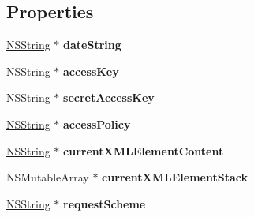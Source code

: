 \subsection*{\-Properties}
\begin{DoxyCompactItemize}
\item 
\hypertarget{interface_a_s_i_s3_request_a2d2ae1919cf3ab5f06886ca2e112f9f4}{
\hyperlink{class_n_s_string}{\-N\-S\-String} $\ast$ {\bfseries date\-String}}
\label{interface_a_s_i_s3_request_a2d2ae1919cf3ab5f06886ca2e112f9f4}

\item 
\hypertarget{interface_a_s_i_s3_request_a74852ee7d378a16b5b1f324864ce8a07}{
\hyperlink{class_n_s_string}{\-N\-S\-String} $\ast$ {\bfseries access\-Key}}
\label{interface_a_s_i_s3_request_a74852ee7d378a16b5b1f324864ce8a07}

\item 
\hypertarget{interface_a_s_i_s3_request_a71538b6b917584e6d8e4e3dd638aa295}{
\hyperlink{class_n_s_string}{\-N\-S\-String} $\ast$ {\bfseries secret\-Access\-Key}}
\label{interface_a_s_i_s3_request_a71538b6b917584e6d8e4e3dd638aa295}

\item 
\hypertarget{interface_a_s_i_s3_request_aae8aa542f29abfd7f87be3c3cafebdeb}{
\hyperlink{class_n_s_string}{\-N\-S\-String} $\ast$ {\bfseries access\-Policy}}
\label{interface_a_s_i_s3_request_aae8aa542f29abfd7f87be3c3cafebdeb}

\item 
\hypertarget{interface_a_s_i_s3_request_a2d5915fe56145cae32106ad0f44d18da}{
\hyperlink{class_n_s_string}{\-N\-S\-String} $\ast$ {\bfseries current\-X\-M\-L\-Element\-Content}}
\label{interface_a_s_i_s3_request_a2d5915fe56145cae32106ad0f44d18da}

\item 
\hypertarget{interface_a_s_i_s3_request_a5cfe2c0ad3eccf3cc2c8c2a7e0381018}{
\-N\-S\-Mutable\-Array $\ast$ {\bfseries current\-X\-M\-L\-Element\-Stack}}
\label{interface_a_s_i_s3_request_a5cfe2c0ad3eccf3cc2c8c2a7e0381018}

\item 
\hypertarget{interface_a_s_i_s3_request_af2bb6580cfc9468d00e101e218c69e07}{
\hyperlink{class_n_s_string}{\-N\-S\-String} $\ast$ {\bfseries request\-Scheme}}
\label{interface_a_s_i_s3_request_af2bb6580cfc9468d00e101e218c69e07}

\end{DoxyCompactItemize}


